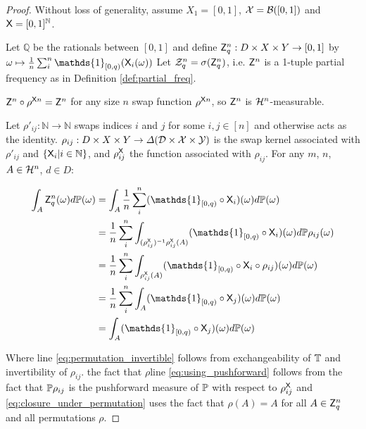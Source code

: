 \begin{proof}
Without loss of generality, assume $X_1=[0,1]$, $\mathcal{X}=\mathcal{B}([0,1])$ and $\mathsf{X}=[0,1]^{\mathbb{N}}$.

Let $\mathbb{Q}$ be the rationals between $[0,1]$ and define $\mathsf{Z}_q^n:D\times X\times Y \to [0,1]$ by $\omega \mapsto \frac{1}{n}\sum_{i}^n \mathds{1}_{[0,q)}(\RV{X}_i(\omega))$ Let $\mathcal{Z}^n_q=\sigma(\mathsf{Z}_q^n)$, i.e. $\mathsf{Z}^n$ is a 1-tuple partial frequency as in Definition \ref{def:partial_freq}.

$\mathsf{Z}^n\circ\rho^{\mathsf{X}n}=\mathsf{Z}^n$ for any size $n$ swap function $\rho^{\mathsf{X}n}$, so $\mathsf{Z}^n$ is $\mathcal{H}^n$-measurable.

Let $\rho'_{ij}:\mathbb{N}\to\mathbb{N}$ swaps indices $i$ and $j$ for some $i,j\in[n]$ and otherwise acts as the identity. $\rho_{ij}:D\times X\times Y\to \Delta(\mathcal{D}\times \mathcal{X}\times \mathcal{Y})$ is the swap kernel associated with $\rho'_{ij}$ and $\{\mathsf{X}_i|i\in \mathbb{N}\}$, and $\rho^{\mathsf{X}}_{ij}$ the function associated with $\rho_{ij}$. For any $m$, $n$, $A\in \mathcal{H}^n$, $d\in D$: 

\begin{align}
    \int_{A} \RV{Z}_q^{n} (\omega) d\prob{P}(\omega) &= \int_{A} \frac{1}{n}\sum_{i}^{n} (\mathds{1}_{[0,q)}\circ \RV{X}_i)(\omega)d\prob{P}(\omega)\\
    &= \frac{1}{n}\sum_{i}^{n} \int_{(\rho^{\RV{X}}_{ij})^{-1}\rho^{\RV{X}}_{ij}(A)} (\mathds{1}_{[0,q)}\circ \RV{X}_i)(\omega)d\prob{P}\rho_{ij}(\omega)\label{eq:permutation_invertible}\\
    &= \frac{1}{n}\sum_{i}^{n} \int_{\rho^{\RV{X}}_{ij}(A)} (\mathds{1}_{[0,q)}\circ \RV{X}_{i}\circ \rho_{ij}) (\omega)d\prob{P}(\omega)\label{eq:using_pushforward}\\
    &= \frac{1}{n}\sum_{i}^{n} \int_{A} (\mathds{1}_{[0,q)}\circ \RV{X}_{j})(\omega)d\prob{P}(\omega)\label{eq:closure_under_permutation}\\
    &= \int_{A} (\mathds{1}_{[0,q)} \circ \RV{X}_j)(\omega)d\prob{P}(\omega) \label{eq:cond_expectation_first}
\end{align}

Where line \ref{eq:permutation_invertible} follows from exchangeability of $\mathbb{T}$ and invertibility of $\rho_{ij}$. the fact that $\rho$line \ref{eq:using_pushforward} follows from the fact that $\mathbb{P}\rho_{ij}$ is the pushforward measure of $\mathbb{P}$ with respect to $\rho^{\mathsf{X}}_{ij}$ and \ref{eq:closure_under_permutation} uses the fact that $\rho(A) = A$ for all $A\in \mathsf{Z}^n_q$ and all permutations $\rho$.


\end{proof}
